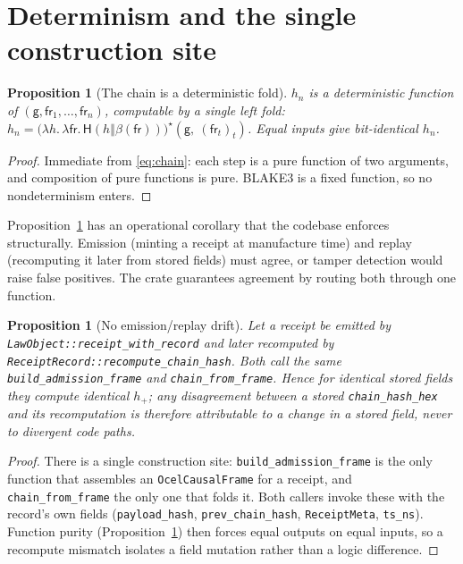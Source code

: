 \documentclass[11pt,oneside]{book}
\theoremstyle{definition}
\theoremstyle{plain}
\newtheorem{proposition}[theorem]{Proposition}
\theoremstyle{remark}
\newcommand{\chainH}{\mathsf{H}}               %
\newcommand{\fr}{\mathsf{fr}}                   %
\newcommand{\body}{\beta}                       %
\newcommand{\code}[1]{\texttt{#1}}
\newcommand{\concat}{\mathbin{\Vert}}           %
\newcommand{\Genesis}{\mathsf{g}}               %
\begin{document}
\section{Determinism and the single construction site}

\begin{proposition}[The chain is a deterministic fold]\label{prop:fold}
$h_n$ is a deterministic function of $(\Genesis,\fr_1,\dots,\fr_n)$, computable by a single
left fold: $h_n=\bigl(\lambda h.\,\lambda \fr.\,\chainH(h\concat\body(\fr))\bigr)^{\!\star}
(\Genesis,\ (\fr_t)_t)$. Equal inputs give bit-identical $h_n$.
\end{proposition}

\begin{proof}
Immediate from \eqref{eq:chain}: each step is a pure function of two arguments, and
composition of pure functions is pure. BLAKE3 is a fixed function, so no nondeterminism
enters. \end{proof}

Proposition~\ref{prop:fold} has an operational corollary that the codebase enforces
structurally. Emission (minting a receipt at manufacture time) and replay (recomputing it
later from stored fields) must agree, or tamper detection would raise false positives. The
crate guarantees agreement by routing both through one function.

\begin{proposition}[No emission/replay drift]\label{prop:nodrift}
Let a receipt be emitted by \code{LawObject::receipt\_with\_record} and later recomputed by
\code{ReceiptRecord::recompute\_chain\_hash}. Both call the same \code{build\_admission\_frame}
and \code{chain\_from\_frame}. Hence for identical stored fields they compute identical
$h_{+}$; any disagreement between a stored \code{chain\_hash\_hex} and its recomputation is
therefore attributable to a change in a stored field, never to divergent code paths.
\end{proposition}

\begin{proof}
There is a single construction site: \code{build\_admission\_frame} is the only function that
assembles an \code{OcelCausalFrame} for a receipt, and \code{chain\_from\_frame} the only one
that folds it. Both callers invoke these with the record's own fields
(\code{payload\_hash}, \code{prev\_chain\_hash}, \code{ReceiptMeta}, \code{ts\_ns}). Function
purity (Proposition~\ref{prop:fold}) then forces equal outputs on equal inputs, so a
recompute mismatch isolates a field mutation rather than a logic difference. \end{proof}
\end{document}
